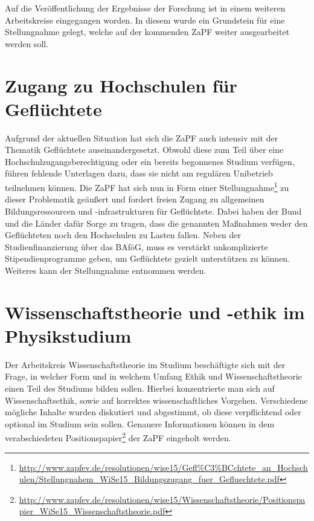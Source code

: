 Auf die Veröffentlichung der Ergebnisse der Forschung ist in einem weiteren Arbeitskreise
eingegangen worden. In diesem wurde ein Grundstein für eine Stellungnahme
gelegt, welche auf der kommenden ZaPF weiter ausgearbeitet werden soll.

\section*{Zugang zu Hochschulen für Geflüchtete}
Aufgrund der aktuellen Situation hat sich die ZaPF auch intensiv mit der
Thematik \glqq{}Geflüchtete\grqq{} auseinandergesetzt. Obwohl diese zum Teil
über eine Hochschulzugangsberechtigung oder ein bereits begonnenes Studium
verfügen, führen fehlende Unterlagen dazu, dass sie nicht am regulären
Unibetrieb teilnehmen können. Die ZaPF hat sich nun in Form einer
Stellungnahme\footnote{\href{http://www.zapfev.de/resolutionen/wise15/Gefl\%C3\%BCchtete\_an\_Hochschulen/Stellungnahem\_WiSe15\_Bildungszugang\_fuer\_Gefluechtete.pdf}{\url{http://www.zapfev.de/resolutionen/wise15/Gefl\%C3\%BCchtete\_an\_Hochschulen/Stellungnahem\_WiSe15\_Bildungszugang\_fuer\_Gefluechtete.pdf}}}
zu dieser Problematik geäußert und fordert freien Zugang zu allgemeinen
Bildungsressourcen und -infrastrukturen für Geflüchtete. Dabei haben der Bund
und die Länder dafür Sorge zu tragen, dass die genannten Maßnahmen weder den
Geflüchteten noch den Hochschulen zu Lasten fallen. Neben der
Studienfinanzierung über das BAföG, muss es verstärkt unkomplizierte
Stipendienprogramme
 geben, um Geflüchtete gezielt unterstützen zu können. Weiteres kann
der Stellungnahme entnommen werden.

\section*{Wissenschaftstheorie und -ethik im Physikstudium}
Der  Arbeitskreis \glqq{}Wissenschaftstheorie im Studium\grqq{} beschäftigte
sich mit der Frage, in welcher Form und in welchem Umfang Ethik und
Wissenschaftstheorie einen Teil des Studiums bilden sollen. Hierbei konzentrierte man
sich auf Wissenschaftsethik, sowie auf korrektes wissenschaftliches Vorgehen.
Verschiedene mögliche Inhalte wurden diskutiert und abgestimmt, ob diese
verpflichtend oder optional im Studium sein sollen. Genauere Informationen
können in dem verabschiedeten
Positionspapier\footnote{\href{http://www.zapfev.de/resolutionen/wise15/Wissenschaftstheorie/Positionspapier\_WiSe15\_Wissenschaftstheorie.pdf}{\url{http://www.zapfev.de/resolutionen/wise15/Wissenschaftstheorie/Positionspapier\_WiSe15\_Wissenschaftstheorie.pdf}}}
der ZaPF eingeholt werden.

